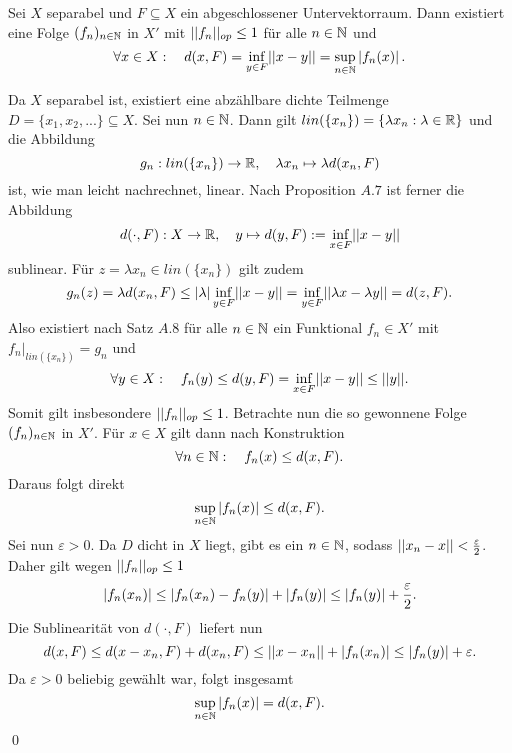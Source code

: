 \begin{corollary}
    Sei $X$ separabel und $F \subseteq X$ ein abgeschlossener Untervektorraum.
    Dann existiert eine Folge $(f_n)_{n \in \mathbb{N}}$ in $X'$ mit $\lvert\lvert f_n \rvert\rvert_{op} \leq 1$ für alle $n \in \mathbb{N}$ und 
    $$
        \forall x \in X: \quad d(x,F) = \inf_{y \in F}\lvert\lvert x-y \rvert\rvert = \sup_{n \in \mathbb{N}}\left| f_n(x) \right|. 
    $$
\end{corollary}
\begin{proof*}
    Da $X$ separabel ist, existiert eine abzählbare dichte Teilmenge $D = \{x_1,x_2,...\} \subseteq X$. Sei nun $n \in \mathbb{N}$. Dann gilt $lin(\{x_n\}) = \{\lambda x_n: \lambda \in \mathbb{R}\}$ und die Abbildung
    $$
        g_n: lin(\{x_n\}) \to \mathbb{R}, \quad \lambda x_n \mapsto \lambda d(x_n,F)
    $$
    ist, wie man leicht nachrechnet, linear. Nach Proposition $A.7$ ist ferner die Abbildung 
    $$
        d(\cdot, F):X \to \mathbb{R}, \quad y \mapsto d(y,F) := \inf_{x \in F}\lvert\lvert x-y \rvert\rvert
    $$
    sublinear. Für $z = \lambda x_n \in lin(\{x_n\})$ gilt zudem 
    $$
        g_n(z) = \lambda d(x_n,F) \leq \left| \lambda \right| \inf_{y \in F}\lvert\lvert x-y \rvert\rvert = \inf_{y \in F}\lvert\lvert \lambda x - \lambda y \rvert\rvert = d(z,F). 
    $$
    Also existiert nach Satz $A.8$ für alle $n \in \mathbb{N}$ ein Funktional $f_n \in X'$ mit $f_n|_{lin(\{x_n\})} = g_n$ und 
    $$
        \forall y \in X: \quad f_n(y) \leq d(y,F) = \inf_{x \in F}\lvert\lvert x-y \rvert\rvert \leq \lvert\lvert y \rvert\rvert. 
    $$
    Somit gilt insbesondere $\lvert\lvert f_n \rvert\rvert_{op} \leq 1$. Betrachte nun die so gewonnene Folge $(f_n)_{n \in \mathbb{N}}$ in $X'$. Für $x \in X$ gilt dann nach Konstruktion
    $$
        \forall n \in \mathbb{N}: \quad f_n(x) \leq d(x,F). 
    $$
    Daraus folgt direkt
    $$
        \sup_{n \in \mathbb{N}}\left| f_n(x) \right| \leq d(x,F).
    $$
    Sei nun $\varepsilon > 0$. Da $D$ dicht in $X$ liegt, gibt es ein $n \in \mathbb{N}$, sodass $\lvert\lvert x_n - x \rvert\rvert < \frac{\varepsilon}{2}$. Daher gilt wegen $\lvert\lvert f_n \rvert\rvert_{op} \leq 1$
    $$
        \left| f_n(x_n) \right| \leq \left| f_n(x_n) - f_n(y) \right| + \left| f_n(y) \right| \leq \left| f_n(y) \right| + \frac{\varepsilon}{2}. 
    $$
    Die Sublinearität von $d(\cdot,F)$ liefert nun 
    $$
        d(x,F) \leq d(x-x_n,F) + d(x_n,F) \leq \lvert\lvert x-x_n \rvert\rvert + \left| f_n(x_n) \right| \leq \left| f_n(y) \right| + \varepsilon. 
    $$
    Da $\varepsilon > 0$ beliebig gewählt war, folgt insgesamt
    $$
        \sup_{n \in \mathbb{N}}\left| f_n(x) \right| = d(x,F).
    $$
    \qed
\end{proof*}
